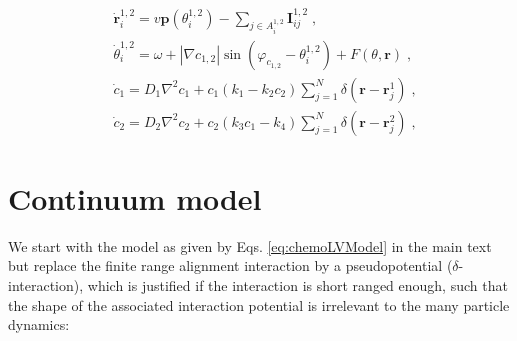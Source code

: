 \documentclass{article}
\begin{document}
\begin{subequations}
    \begin{align}
        &\dot{\mathbf{r}}_{i}^{1,2}=v\mathbf{p}\left( \theta _{i}^{1,2} \right) -\sum_{j\in A_{i}^{1,2}}{\mathbf{I}_{ij}^{1,2}\;,}\label{dotR}\\
        &\dot{\theta}_{i}^{1,2}=\omega + \left| \nabla c_{1,2} \right|\sin \left( \varphi _{c_{1,2}}-\theta _{i}^{1,2} \right) +F\left( \theta ,\mathbf{r} \right) \;,\label{dotTheta}\\
        &\dot{c}_1=D_1\nabla ^2c_1+c_1\left( k_1-k_2c_2 \right) \sum_{j=1}^N{\delta \left( \mathbf{r}-\mathbf{r}_{j}^{1} \right) \;,}\\
        &\dot{c}_2=D_2\nabla ^2c_2+c_2\left( k_3c_1-k_4 \right) \sum_{j=1}^N{\delta \left( \mathbf{r}-\mathbf{r}_{j}^{2} \right) \;,}
    \end{align}
    \label{eq:chemoLVModel}
\end{subequations}

\section{Continuum model}
We start with the model as given by Eqs. \eqref{eq:chemoLVModel} in the main text but replace the finite range alignment interaction by a pseudopotential ($\delta$-interaction), which is justified if the interaction is short ranged enough, such that the shape of the associated interaction potential is irrelevant to the many particle dynamics:
\end{document}

